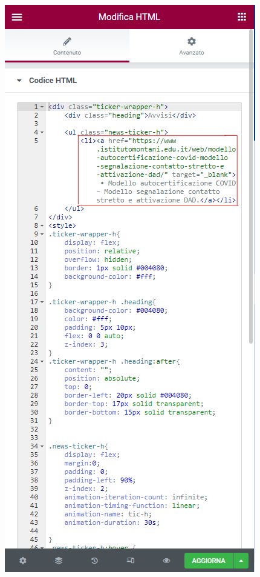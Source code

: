 \documentclass{article}
\begin{document}
		\begin{center}
			\includegraphics[scale=0.28]{Modifica Slider Avvisi.png}\\
		\end{center}
\end{document}
